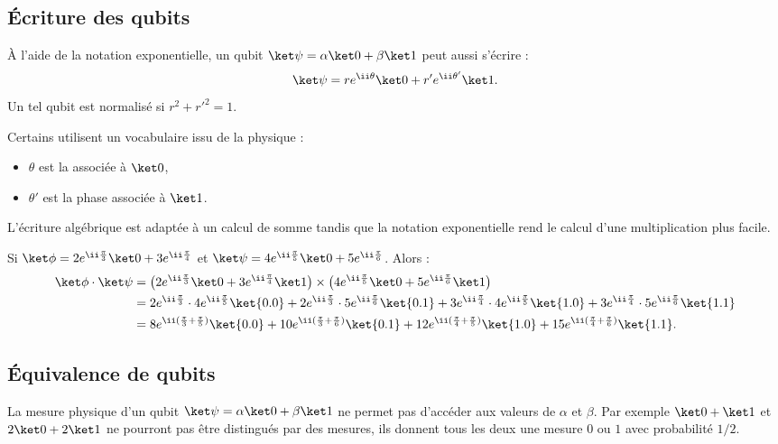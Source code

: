 \documentclass[11pt,class=report,crop=false]{standalone}
\begin{document}
\subsection{Écriture des qubits}

À l'aide de la notation exponentielle, un qubit $\ket\psi = \alpha \ket0 + \beta \ket1$ peut aussi s'écrire :
$$\ket \psi = r e^{\ii\theta} \ket0 + r'e^{\ii\theta'} \ket1.$$
Un tel qubit est normalisé si $r^2+r'^2=1$.

Certains utilisent un vocabulaire issu de la physique :
\begin{itemize}
  \item $\theta$ est la  associée à $\ket0$,
  \item $\theta'$ est la phase associée à $\ket1$.
\end{itemize}

L'écriture algébrique est adaptée à un calcul de somme tandis que la notation exponentielle rend le calcul d'une multiplication plus facile.


\begin{exemple}
Si $\ket\phi = 2e^{\ii \frac\pi3}\ket0+3e^{\ii\frac\pi4}$ et
$\ket\psi = 4e^{\ii \frac\pi5}\ket0+5e^{\ii\frac\pi6}$.
Alors :
\begin{align*}
\ket\phi \cdot \ket\psi 
  &= \left(2e^{\ii \frac\pi3}\ket0+3e^{\ii\frac\pi4}\ket1\right) \times
  \left(4e^{\ii \frac\pi5}\ket0+5e^{\ii\frac\pi6}\ket1\right) \\
  &= 2e^{\ii \frac\pi3} \cdot 4e^{\ii \frac\pi5}\ket{0.0}
  + 2e^{\ii \frac\pi3} \cdot 5e^{\ii\frac\pi6} \ket{0.1}
  + 3e^{\ii\frac\pi4} \cdot 4e^{\ii \frac\pi5}\ket{1.0} 
  + 3e^{\ii\frac\pi4} \cdot 5e^{\ii\frac\pi6} \ket{1.1} \\
  &= 8e^{\ii (\frac\pi3+\frac\pi5)}\ket{0.0}
    + 10e^{\ii (\frac\pi3+\frac\pi6)} \ket{0.1}
    + 12e^{\ii(\frac\pi4+\frac\pi5)}\ket{1.0} 
    + 15e^{\ii(\frac\pi4+\frac\pi6)} \ket{1.1}. \\
\end{align*}
\end{exemple}


\subsection{Équivalence de qubits}

La mesure physique d'un qubit $\ket\psi = \alpha\ket0+\beta\ket1$ ne permet pas d'accéder aux valeurs de $\alpha$ et $\beta$.
Par exemple $\ket0+\ket1$ et $2\ket0+2\ket1$ ne pourront pas être distingués par des mesures, ils donnent tous les deux une mesure $0$ ou $1$ avec probabilité $1/2$.
\end{document}
